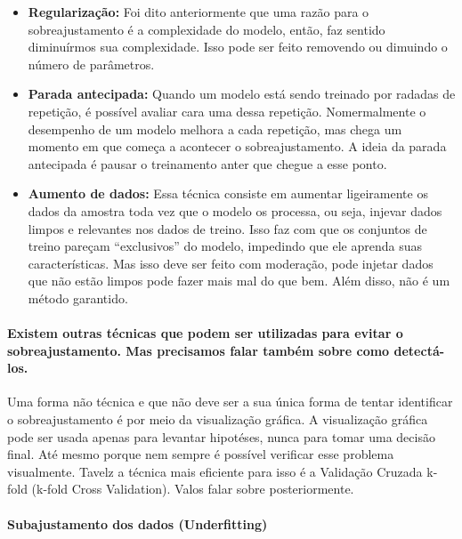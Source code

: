 \documentclass[
  letterpaper,
  DIV=11,
  numbers=noendperiod]{scrreprt}
\let\oldparagraph\paragraph
\renewcommand{\paragraph}[1]{\oldparagraph{#1}\mbox{}}
\begin{document}
\begin{itemize}
\item
  \textbf{Regularização:} Foi dito anteriormente que uma razão para o
  sobreajustamento é a complexidade do modelo, então, faz sentido
  diminuírmos sua complexidade. Isso pode ser feito removendo ou
  dimuindo o número de parâmetros.
\item
  \textbf{Parada antecipada:} Quando um modelo está sendo treinado por
  radadas de repetição, é possível avaliar cara uma dessa repetição.
  Nomermalmente o desempenho de um modelo melhora a cada repetição, mas
  chega um momento em que começa a acontecer o sobreajustamento. A ideia
  da parada antecipada é pausar o treinamento anter que chegue a esse
  ponto.
\item
  \textbf{Aumento de dados:} Essa técnica consiste em aumentar
  ligeiramente os dados da amostra toda vez que o modelo os processa, ou
  seja, injevar dados limpos e relevantes nos dados de treino. Isso faz
  com que os conjuntos de treino pareçam ``exclusivos'' do modelo,
  impedindo que ele aprenda suas características. Mas isso deve ser
  feito com moderação, pode injetar dados que não estão limpos pode
  fazer mais mal do que bem. Além disso, não é um método garantido.
\end{itemize}

\hypertarget{existem-outras-tuxe9cnicas-que-podem-ser-utilizadas-para-evitar-o-sobreajustamento.-mas-precisamos-falar-tambuxe9m-sobre-como-detectuxe1-los.}{%
\paragraph{Existem outras técnicas que podem ser utilizadas para evitar
o sobreajustamento. Mas precisamos falar também sobre como
detectá-los.}\label{existem-outras-tuxe9cnicas-que-podem-ser-utilizadas-para-evitar-o-sobreajustamento.-mas-precisamos-falar-tambuxe9m-sobre-como-detectuxe1-los.}}

Uma forma não técnica e que não deve ser a sua única forma de tentar
identificar o sobreajustamento é por meio da visualização gráfica. A
visualização gráfica pode ser usada apenas para levantar hipotéses,
nunca para tomar uma decisão final. Até mesmo porque nem sempre é
possível verificar esse problema visualmente. Tavelz a técnica mais
eficiente para isso é a Validação Cruzada k-fold (k-fold Cross
Validation). Valos falar sobre posteriormente.

\hypertarget{subajustamento-dos-dados-underfitting}{%
\paragraph{\texorpdfstring{Subajustamento dos dados
(\textbf{Underfitting})}{Subajustamento dos dados (Underfitting)}}\label{subajustamento-dos-dados-underfitting}}
\end{document}
